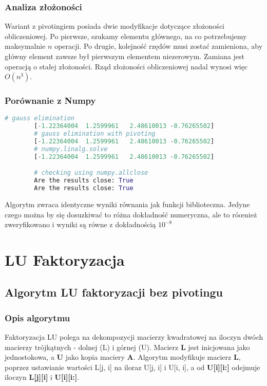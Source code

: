 \documentclass[12pt,a4paper,table]{article}
\begin{document}
    \subsubsection{Analiza złożoności}
    Wariant z pivotingiem posiada dwie modyfikacje dotyczące złożoności obliczeniowej. Po pierwsze, szukamy elementu głównego, na co potrzebujemy maksymalnie \( n \) operacji. Po drugie, kolejność rzędów musi zostać zamieniona, aby główny element zawsze był pierwszym elementem niezerowym. Zamiana jest operacją o stałej złożoności. Rząd złożoności obliczeniowej nadal wynosi więc \( O(n^3) \).

    
    \subsubsection{Porównanie z Numpy}

    \begin{lstlisting}[language=Python]
        # gauss elimination
        [-1.22364004  1.2599961   2.48610013 -0.76265502]
        # gauss elimination with pivoting
        [-1.22364004  1.2599961   2.48610013 -0.76265502]
        # numpy.linalg.solve
        [-1.22364004  1.2599961   2.48610013 -0.76265502]

        # checking using numpy.allclose
        Are the results close: True
        Are the results close: True

    \end{lstlisting}
    
    Algorytm zwraca identyczne wyniki równania jak funkcji 
    biblioteczna. Jedyne czego można by się dosuzkiwać to różna dokładność numeryczna,
    ale to róœnież zweryfikowano i wyniki są równe z dokładnością $10^{-8}$

    \section{LU Faktoryzacja}

    \subsection{Algorytm LU faktoryzacji bez pivotingu}
    \subsubsection{Opis algorytmu}
    Faktoryzacja LU polega na dekompozycji macierzy kwadratowej na iloczyn dwóch macierzy trójkątnych - dolnej (L) i górnej (U). Macierz \textbf{L} jest inicjowana jako jednostokowa, a \textbf{U} jako kopia maciery \textbf{A}. Algorytm modyfikuje macierz \textbf{L}, poprzez ustawianie wartości L[j, i] na iloraz U[j, i] i U[i, i], a od \textbf{U[i][i:]} odejmuje iloczyn \textbf{L[j][i]} i \textbf{U[i][i:]}. 
\end{document}
